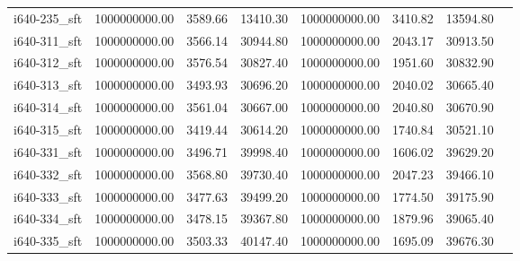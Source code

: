 \begin{tabular}{llrrrrrr}
i640-235\_sft &      1000000000.00 &                3589.66 &         13410.30 &    1000000000.00 &              3410.82 &       13594.80 \\
i640-311\_sft &      1000000000.00 &                3566.14 &         30944.80 &    1000000000.00 &              2043.17 &       30913.50 \\
i640-312\_sft &      1000000000.00 &                3576.54 &         30827.40 &    1000000000.00 &              1951.60 &       30832.90 \\
i640-313\_sft &      1000000000.00 &                3493.93 &         30696.20 &    1000000000.00 &              2040.02 &       30665.40 \\
i640-314\_sft &      1000000000.00 &                3561.04 &         30667.00 &    1000000000.00 &              2040.80 &       30670.90 \\
i640-315\_sft &      1000000000.00 &                3419.44 &         30614.20 &    1000000000.00 &              1740.84 &       30521.10 \\
i640-331\_sft &      1000000000.00 &                3496.71 &         39998.40 &    1000000000.00 &              1606.02 &       39629.20 \\
i640-332\_sft &      1000000000.00 &                3568.80 &         39730.40 &    1000000000.00 &              2047.23 &       39466.10 \\
i640-333\_sft &      1000000000.00 &                3477.63 &         39499.20 &    1000000000.00 &              1774.50 &       39175.90 \\
i640-334\_sft &      1000000000.00 &                3478.15 &         39367.80 &    1000000000.00 &              1879.96 &       39065.40 \\
i640-335\_sft &      1000000000.00 &                3503.33 &         40147.40 &    1000000000.00 &              1695.09 &       39676.30 \\
\bottomrule
\end{tabular}
